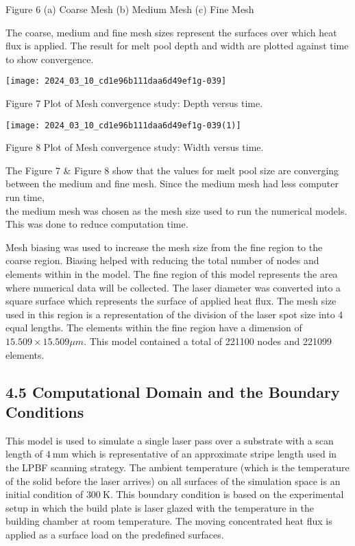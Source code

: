 \documentclass[10pt]{article}
\begin{document}
Figure 6 (a) Coarse Mesh (b) Medium Mesh (c) Fine Mesh

The coarse, medium and fine mesh sizes represent the surfaces over which heat flux is applied. The result for melt pool depth and width are plotted against time to show convergence.

\begin{center}
\texttt{[image: 2024\_03\_10\_cd1e96b111daa6d49ef1g-039]}
\end{center}

Figure 7 Plot of Mesh convergence study: Depth versus time.

\begin{center}
\texttt{[image: 2024\_03\_10\_cd1e96b111daa6d49ef1g-039(1)]}
\end{center}

Figure 8 Plot of Mesh convergence study: Width versus time.

The Figure 7 \& Figure 8 show that the values for melt pool size are converging between the medium and fine mesh. Since the medium mesh had less computer run time,\\
the medium mesh was chosen as the mesh size used to run the numerical models. This was done to reduce computation time.

Mesh biasing was used to increase the mesh size from the fine region to the coarse region. Biasing helped with reducing the total number of nodes and elements within in the model. The fine region of this model represents the area where numerical data will be collected. The laser diameter was converted into a square surface which represents the surface of applied heat flux. The mesh size used in this region is a representation of the division of the laser spot size into 4 equal lengths. The elements within the fine region have a dimension of $15.509 \times 15.509 \mu m$. This model contained a total of 221100 nodes and 221099 elements.

\subsection*{4.5 Computational Domain and the Boundary Conditions}
This model is used to simulate a single laser pass over a substrate with a scan length of $4 \mathrm{~mm}$ which is representative of an approximate stripe length used in the LPBF scanning strategy. The ambient temperature (which is the temperature of the solid before the laser arrives) on all surfaces of the simulation space is an initial condition of $300 \mathrm{~K}$. This boundary condition is based on the experimental setup in which the build plate is laser glazed with the temperature in the building chamber at room temperature. The moving concentrated heat flux is applied as a surface load on the predefined surfaces.
\end{document}

